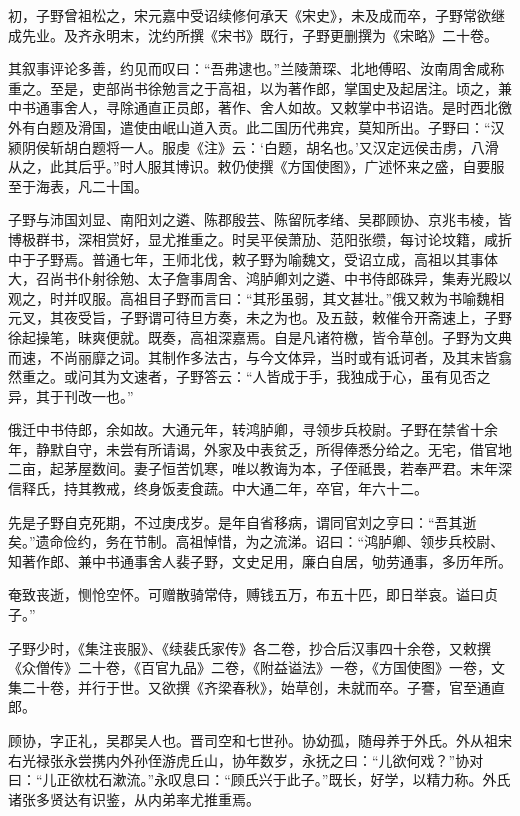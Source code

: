 \documentclass[12pt,UTF8]{ctexbook}
\begin{document}
初，子野曾祖松之，宋元嘉中受诏续修何承天《宋史》，未及成而卒，子野常欲继成先业。及齐永明末，沈约所撰《宋书》既行，子野更删撰为《宋略》二十卷。

其叙事评论多善，约见而叹曰：“吾弗逮也。”兰陵萧琛、北地傅昭、汝南周舍咸称重之。至是，吏部尚书徐勉言之于高祖，以为著作郎，掌国史及起居注。顷之，兼中书通事舍人，寻除通直正员郎，著作、舍人如故。又敕掌中书诏诰。是时西北徼外有白题及滑国，遣使由岷山道入贡。此二国历代弗宾，莫知所出。子野曰：“汉颍阴侯斩胡白题将一人。服虔《注》云：‘白题，胡名也。’又汉定远侯击虏，八滑从之，此其后乎。”时人服其博识。敕仍使撰《方国使图》，广述怀来之盛，自要服至于海表，凡二十国。

子野与沛国刘显、南阳刘之遴、陈郡殷芸、陈留阮孝绪、吴郡顾协、京兆韦棱，皆博极群书，深相赏好，显尤推重之。时吴平侯萧劢、范阳张缵，每讨论坟籍，咸折中于子野焉。普通七年，王师北伐，敕子野为喻魏文，受诏立成，高祖以其事体大，召尚书仆射徐勉、太子詹事周舍、鸿胪卿刘之遴、中书侍郎硃异，集寿光殿以观之，时并叹服。高祖目子野而言曰：“其形虽弱，其文甚壮。”俄又敕为书喻魏相元叉，其夜受旨，子野谓可待旦方奏，未之为也。及五鼓，敕催令开斋速上，子野徐起操笔，昧爽便就。既奏，高祖深嘉焉。自是凡诸符檄，皆令草创。子野为文典而速，不尚丽靡之词。其制作多法古，与今文体异，当时或有诋诃者，及其末皆翕然重之。或问其为文速者，子野答云：“人皆成于手，我独成于心，虽有见否之异，其于刊改一也。”

俄迁中书侍郎，余如故。大通元年，转鸿胪卿，寻领步兵校尉。子野在禁省十余年，静默自守，未尝有所请谒，外家及中表贫乏，所得俸悉分给之。无宅，借官地二亩，起茅屋数间。妻子恒苦饥寒，唯以教诲为本，子侄祗畏，若奉严君。末年深信释氏，持其教戒，终身饭麦食蔬。中大通二年，卒官，年六十二。

先是子野自克死期，不过庚戌岁。是年自省移病，谓同官刘之亨曰：“吾其逝矣。”遗命俭约，务在节制。高祖悼惜，为之流涕。诏曰：“鸿胪卿、领步兵校尉、知著作郎、兼中书通事舍人裴子野，文史足用，廉白自居，劬劳通事，多历年所。

奄致丧逝，恻怆空怀。可赠散骑常侍，赙钱五万，布五十匹，即日举哀。谥曰贞子。”

子野少时，《集注丧服》、《续裴氏家传》各二卷，抄合后汉事四十余卷，又敕撰《众僧传》二十卷，《百官九品》二卷，《附益谥法》一卷，《方国使图》一卷，文集二十卷，并行于世。又欲撰《齐梁春秋》，始草创，未就而卒。子謇，官至通直郎。

顾协，字正礼，吴郡吴人也。晋司空和七世孙。协幼孤，随母养于外氏。外从祖宋右光禄张永尝携内外孙侄游虎丘山，协年数岁，永抚之曰：“儿欲何戏？”协对曰：“儿正欲枕石漱流。”永叹息曰：“顾氏兴于此子。”既长，好学，以精力称。外氏诸张多贤达有识鉴，从内弟率尤推重焉。
\end{document}

